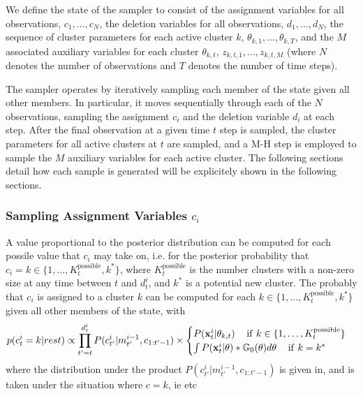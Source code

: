 \documentclass[smallcondensed, final]{svjour3}
\begin{document}
We define the state of the sampler to consist of the assignment variables for all observations, $c_{1}, \ldots, c_{N}$, the deletion variables for all observations, $d_{1}, \dots, d_{N}$, the sequence of cluster parameters for each active cluster $k$, $\theta_{k,1}, \ldots, \theta_{k, T}$, and the $M$ associated auxiliary variables for each cluster $\theta_{k,t}$, $z_{k,t,1}, \ldots, z_{k, t, M}$ (where $N$ denotes the number of observations and $T$ denotes the number of time steps).

The sampler operates by iteratively sampling each member of the state given all other members. In particular, it moves sequentially through each of the $N$ observations, sampling the assignment $c_{i}$ and the deletion variable $d_{i}$ at each step. After the final observation at a given time $t$ step is sampled, the cluster parameters for all active clusters at $t$ are sampled, and a M-H step is employed to sample the $M$ auxiliary variables for each active cluster. The following sections detail how each sample is generated will be explicitely shown in the following sections.


\subsubsection{Sampling Assignment Variables $c_{i}$}

A value proportional to the posterior distribution can be computed for each possile value that $c_{i}$ may take on, i.e. for the posterior probability that $c_{i} = k \in \{ 1 , \ldots ,  K_{t}^{\text{possible}}, k^{*}\}$, where $K_{t}^{\text{possible}}$ is the number clusters with a non-zero size at any time between $t$ and $d_{t}^{i}$, and $k^{*}$ is a potential new cluster. The probably that $c_{i}$ is assigned to a cluster $k$ can be computed for each $k \in \{ 1 , \ldots ,  K_{t}^{\text{possible}}, k^{*} \}$ given all other members of the state, with
\begin{equation}
p(c_{t}^{i} = k | rest) \propto \prod_{t' = t}^{d_{t}^{i}} P(c_{t'}^{i} | m_{t'}^{i-1}, c_{1:t'-1}) \newline \times
\begin{cases}
	P(\bold{x}_{t}^{i} | \theta_{k,t})                                    \hspace{12pt} \text{if} \hspace{4pt} k \in \{ 1, \ldots, K_{t}^{\text{possible}} \} \\
	\int P(\bold{x}_{t}^{i} | \theta) * \mathbb{G}_{0}(\theta) d\theta    \hspace{12pt} \text{if}  \hspace{4pt}  k = k^{*}
\end{cases}
\end{equation}
where the distribution under the product $P(c_{t'}^{i} | m_{t'}^{i-1}, c_{1:t'-1})$ is given in, and is taken under the situation where $c = k$, ie etc
\end{document}
